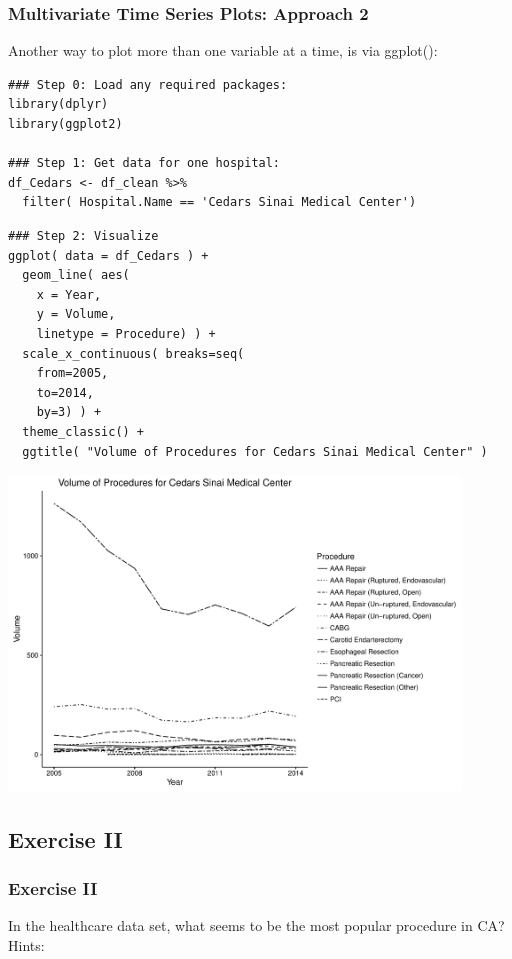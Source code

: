 \begin{frame}
 \frametitle{Multivariate Time Series Plots: Approach 2}

Another way to plot more than one variable at a time, is via \ttfamily ggplot()\normalfont :

    \begin{lstlisting}
### Step 0: Load any required packages:
library(dplyr)
library(ggplot2)

### Step 1: Get data for one hospital:
df_Cedars <- df_clean %>%
  filter( Hospital.Name == 'Cedars Sinai Medical Center')
   \end{lstlisting}

\newpage
    \begin{lstlisting}
### Step 2: Visualize
ggplot( data = df_Cedars ) + 
  geom_line( aes(
    x = Year, 
    y = Volume, 
    linetype = Procedure) ) +
  scale_x_continuous( breaks=seq(
    from=2005, 
    to=2014, 
    by=3) ) +
  theme_classic() +
  ggtitle( "Volume of Procedures for Cedars Sinai Medical Center" )
   \end{lstlisting}

\newpage
       \begin{center}
         \includegraphics[width=0.9\textwidth]{images/timeseries_Cedars}
        \end{center}
\end{frame}

\subsection{Exercise II}
\begin{frame}[fragile]
	\frametitle{Exercise II}
	In the healthcare data set, what seems to be the most popular procedure in CA?\\
  \vspace{10pt}
  \noindent Hints: \small


    \normalsize
\end{frame}
